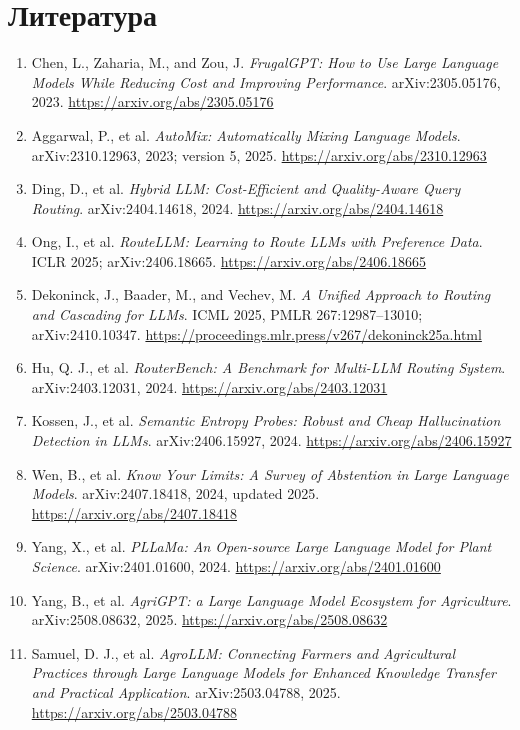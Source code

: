\documentclass[14pt,a4paper]{extarticle}
\begin{document}
\section*{Литература}\begingroup\fontsize{12}{14}\selectfont\begin{enumerate}
\item Chen, L., Zaharia, M., and Zou, J. \emph{FrugalGPT: How to Use Large Language Models While Reducing Cost and Improving Performance}. arXiv:2305.05176, 2023. \url{https://arxiv.org/abs/2305.05176}
\item Aggarwal, P., et al. \emph{AutoMix: Automatically Mixing Language Models}. arXiv:2310.12963, 2023; version 5, 2025. \url{https://arxiv.org/abs/2310.12963}
\item Ding, D., et al. \emph{Hybrid LLM: Cost-Efficient and Quality-Aware Query Routing}. arXiv:2404.14618, 2024. \url{https://arxiv.org/abs/2404.14618}
\item Ong, I., et al. \emph{RouteLLM: Learning to Route LLMs with Preference Data}. ICLR 2025; arXiv:2406.18665. \url{https://arxiv.org/abs/2406.18665}
\item Dekoninck, J., Baader, M., and Vechev, M. \emph{A Unified Approach to Routing and Cascading for LLMs}. ICML 2025, PMLR 267:12987--13010; arXiv:2410.10347. \url{https://proceedings.mlr.press/v267/dekoninck25a.html}
\item Hu, Q. J., et al. \emph{RouterBench: A Benchmark for Multi-LLM Routing System}. arXiv:2403.12031, 2024. \url{https://arxiv.org/abs/2403.12031}
\item Kossen, J., et al. \emph{Semantic Entropy Probes: Robust and Cheap Hallucination Detection in LLMs}. arXiv:2406.15927, 2024. \url{https://arxiv.org/abs/2406.15927}
\item Wen, B., et al. \emph{Know Your Limits: A Survey of Abstention in Large Language Models}. arXiv:2407.18418, 2024, updated 2025. \url{https://arxiv.org/abs/2407.18418}
\item Yang, X., et al. \emph{PLLaMa: An Open-source Large Language Model for Plant Science}. arXiv:2401.01600, 2024. \url{https://arxiv.org/abs/2401.01600}
\item Yang, B., et al. \emph{AgriGPT: a Large Language Model Ecosystem for Agriculture}. arXiv:2508.08632, 2025. \url{https://arxiv.org/abs/2508.08632}
\item Samuel, D. J., et al. \emph{AgroLLM: Connecting Farmers and Agricultural Practices through Large Language Models for Enhanced Knowledge Transfer and Practical Application}. arXiv:2503.04788, 2025. \url{https://arxiv.org/abs/2503.04788}

\end{enumerate}
\end{document}
